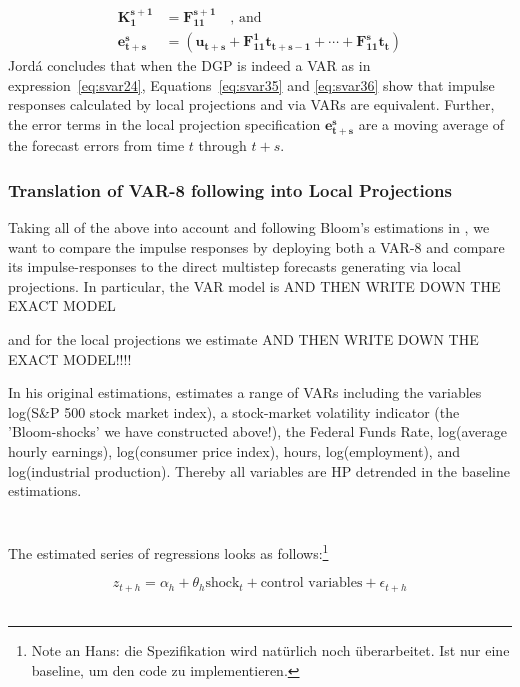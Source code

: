 \documentclass[a4paper,11pt,listof=nochaptergap,oneside,pointednumbers,bibtotoc,bigheadings,liststotoc]{scrbook}
\renewcommand*{\paragraph}[1]{\subsubsection*{#1} \vspace{-3mm}} %
\newcommand{\vect}[1]{\boldsymbol{\mathbf{#1}}}
\begin{document}
\begin{enumerate}
\begin{equation}
\begin{split}
		\vect{K_1^{s+1}} & = \vect{F_{11}^{s+1}} \quad \text{, and} \\
		\vect{e_{t+s}^s} & = (\vect{u_{t+s}} + \vect{F_{11}^1}\vect{t_{t+s-1}} + \cdots + \vect{F_{11}^s}\vect{t_{t}})
	\end{split}								
	\end{equation}	
	Jordá concludes that when the DGP is indeed a VAR as in expression~\ref{eq:svar24}, Equations~\ref{eq:svar35} and \ref{eq:svar36} show that impulse responses calculated by local projections and via VARs are equivalent. Further, the error terms in the local projection specification $\vect{e_{t+s}^s}$ are a moving average of the forecast errors from time $t$ through $t+s$.
\end{enumerate}

\paragraph{Translation of VAR-8 following \citet{bloom:09} into Local Projections}
Taking all of the above into account and following Bloom's estimations in \citet{bloom:09}, we want to compare the impulse responses by deploying both a VAR-8 and compare its impulse-responses to the direct multistep forecasts generating via local projections. In particular, the VAR model is AND THEN WRITE DOWN THE EXACT MODEL 


and for the local projections we estimate AND THEN WRITE DOWN THE EXACT MODEL!!!!

In his original estimations, \citet{bloom:09} estimates a range of VARs including the variables log(S\&P 500 stock market index), a stock-market volatility indicator (the 'Bloom-shocks' we have constructed above!), the Federal Funds Rate, log(average hourly earnings), log(consumer price index), hours, log(employment), and log(industrial production). Thereby all variables are HP detrended in the baseline estimations.\\
\\
\\
The estimated series of regressions looks as follows:\footnote{Note an Hans: die Spezifikation wird natürlich noch überarbeitet. Ist nur eine baseline, um den code zu implementieren.}

\begin{equation} \label{eq:2.1}
z_{t+h} = \alpha_h + \theta_h \text{shock}_t + \text{control variables} + \epsilon_{t+h}
\end{equation}\\
\end{document}
